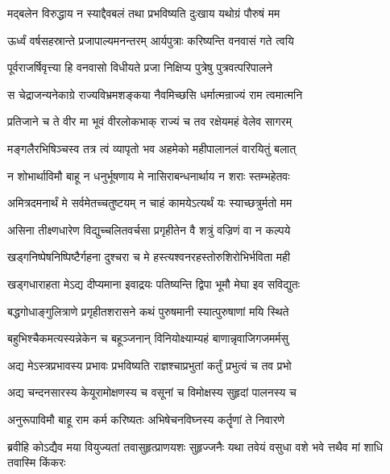 \twolineshloka
{मद्बलेन विरुद्धाय न स्याद्दैवबलं तथा}
{प्रभविष्यति दुःखाय यथोग्रं पौरुषं मम} %

\twolineshloka
{ऊर्ध्वं वर्षसहस्रान्ते प्रजापाल्यमनन्तरम्}
{आर्यपुत्राः करिष्यन्ति वनवासं गते त्वयि} %

\twolineshloka
{पूर्वराजर्षिवृत्त्या हि वनवासो विधीयते}
{प्रजा निक्षिप्य पुत्रेषु पुत्रवत्परिपालने} %

\twolineshloka
{स चेद्राजन्यनेकाग्रे राज्यविभ्रमशङ्कया}
{नैवमिच्छसि धर्मात्मन्राज्यं राम त्वमात्मनि} %

\twolineshloka
{प्रतिजाने च ते वीर मा भूवं वीरलोकभाक्}
{राज्यं च तव रक्षेयमहं वेलेव सागरम्} %

\twolineshloka
{मङ्गलैरभिषिञ्चस्व तत्र त्वं व्यापृतो भव}
{अहमेको महीपालानलं वारयितुं बलात्} %

\twolineshloka
{न शोभार्थाविमौ बाहू न धनुर्भूषणाय मे}
{नासिराबन्धनार्थाय न शराः स्तम्भहेतवः} %

\twolineshloka
{अमित्रदमनार्थं मे सर्वमेतच्चतुष्टयम्}
{न चाहं कामयेऽत्यर्थं यः स्याच्छत्रुर्मतो मम} %

\twolineshloka
{असिना तीक्ष्णधारेण विद्युच्चलितवर्चसा}
{प्रगृहीतेन वै शत्रुं वज्रिणं वा न कल्पये} %

\twolineshloka
{खड्गनिष्पेषनिष्पिष्टैर्गहना दुश्चरा च मे}
{हस्त्यश्वनरहस्तोरुशिरोभिर्भविता मही} %

\twolineshloka
{खड्गधाराहता मेऽद्य दीप्यमाना इवाद्रयः}
{पतिष्यन्ति द्विपा भूमौ मेघा इव सविद्युतः} %

\twolineshloka
{बद्धगोधाङ्गुलित्राणे प्रगृहीतशरासने}
{कथं पुरुषमानी स्यात्पुरुषाणां मयि स्थिते} %

\twolineshloka
{बहुभिश्चैकमत्यस्यन्नेकेन च बहूञ्जनान्}
{विनियोक्ष्याम्यहं बाणान्नृवाजिगजमर्मसु} %

\twolineshloka
{अद्य मेऽस्त्रप्रभावस्य प्रभावः प्रभविष्यति}
{राज्ञश्चाप्रभुतां कर्तुं प्रभुत्वं च तव प्रभो} %

\twolineshloka
{अद्य चन्दनसारस्य केयूरामोक्षणस्य च}
{वसूनां च विमोक्षस्य सुहृदां पालनस्य च} %

\twolineshloka
{अनुरूपाविमौ बाहू राम कर्म करिष्यतः}
{अभिषेचनविघ्नस्य कर्तॄणां ते निवारणे} %

\fourlineindentedshloka
{ब्रवीहि कोऽद्यैव मया वियुज्यतां}
{ तवासुहृत्प्राणयशः सुहृज्जनैः}
{यथा तवेयं वसुधा वशे भवे}
{त्तथैव मां शाधि तवास्मि किंकरः} %

